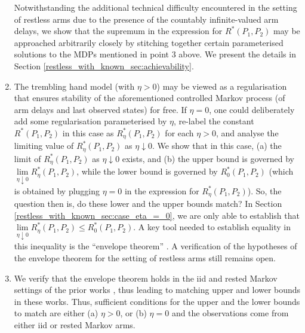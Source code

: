 \begin{enumerate}
	Notwithstanding the additional technical difficulty encountered in the setting of restless arms due to the presence of the countably infinite-valued arm delays, we show that the supremum in the expression for $R^*(P_1, P_2)$ may be approached arbitrarily closely by stitching together certain parameterised solutions to the MDPs mentioned in point 3 above. We present the details in Section \ref{restless_with_known_sec:achievability}.
		
    \item The trembling hand model (with $\eta>0$) may be viewed as a regularisation that ensures stability of the aforementioned controlled Markov process (of arm delays and last observed states) for free. If $\eta=0$, one could deliberately add some regularisation parameterised by $\eta$, re-label the constant $R^*(P_1,P_2)$ in this case as $R_\eta^*(P_1,P_2)$ for each $\eta>0$, and analyse the limiting value of $R_\eta^*(P_1,P_2)$ as $\eta\downarrow 0$. We show that in this case, (a) the limit of $R_\eta^*(P_1,P_2)$ as $\eta\downarrow 0$ exists, and (b) the upper bound is governed by $\lim\limits_{\eta\downarrow 0}R_\eta^*(P_1,P_2)$, while the lower bound is governed by $R_0^*(P_1,P_2)$ (which is obtained by plugging $\eta=0$ in the expression for $R_\eta^*(P_1,P_2)$). So, the question then is, do these lower and the upper bounds match? In Section \ref{restless_with_known_sec:case_eta_=_0}, we are only able to establish that $\lim\limits_{\eta\downarrow 0}R_\eta^*(P_1,P_2)\leq R_0^*(P_1,P_2)$. A key tool needed to establish equality in this inequality is the ``envelope theorem'' \cite[Theorem 2]{milgrom2002envelope}. A verification of the hypotheses of the envelope theorem for the setting of restless arms still remains open.
    
	\item We verify that the envelope theorem holds in the iid and rested Markov settings of the prior works \cite{Vaidhiyan2017,vaidhiyan2012active, vaidhiyan2017learning, prabhu2017optimal}, thus leading to matching upper and lower bounds in these works. Thus, sufficient conditions for the upper and the lower bounds to match are either (a) $\eta>0$, or (b) $\eta=0$ and the observations come from either iid or rested Markov arms.
\end{enumerate}

